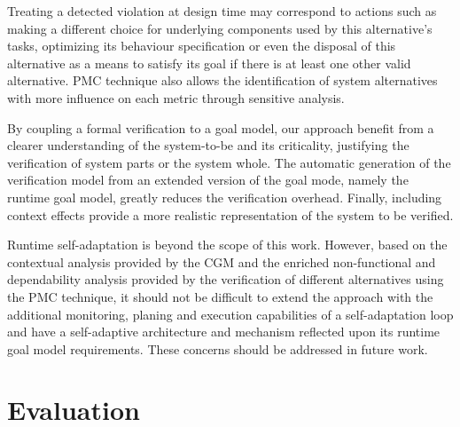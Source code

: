 Treating a detected violation at design time may correspond to actions such as making a different choice for underlying components used by this alternative's tasks, optimizing its behaviour specification or even the disposal of this alternative as a means to satisfy its goal if there is at least one other valid alternative. PMC technique also allows the identification of system alternatives with more influence on each metric through sensitive analysis. 

By coupling a formal verification to a goal model, our approach benefit from a clearer understanding of the system-to-be and its criticality, justifying the verification of system parts or the system whole. The automatic generation of the verification model from an extended version of the goal mode, namely the runtime goal model, greatly reduces the verification overhead. Finally, including context effects provide a more realistic representation of the system to be verified.

Runtime self-adaptation is beyond the scope of this work. However, based on the contextual analysis provided by the CGM and the enriched non-functional and dependability analysis provided by the verification of different alternatives using the PMC technique, it should not be difficult to extend the approach with the additional monitoring, planing and execution capabilities of a self-adaptation loop and have a self-adaptive architecture and mechanism reflected upon its runtime goal model requirements. These concerns should be addressed in future work.




\section{Evaluation}

